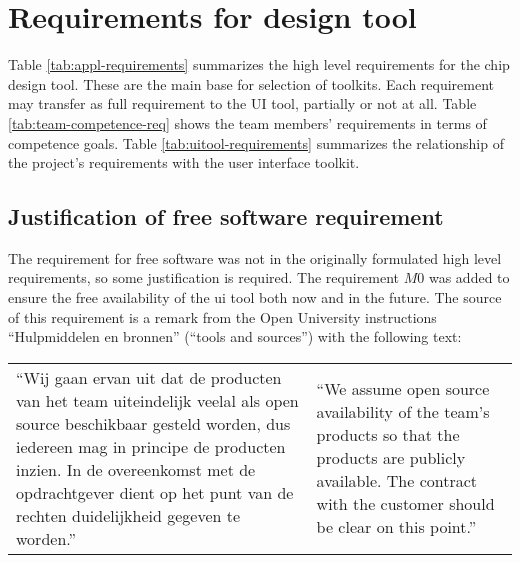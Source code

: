\section{Requirements for design tool}

Table \ref{tab:appl-requirements} summarizes the high level requirements for
the chip design tool. These are the main base for selection of toolkits. Each 
requirement may transfer as full requirement to the UI tool, partially or 
not at all. 
Table \ref{tab:team-competence-req} shows the team members' requirements in 
terms of competence goals. 
Table \ref{tab:uitool-requirements} summarizes the relationship 
of the project's requirements with the user interface toolkit.

\subsection{Justification of free software requirement}

The requirement for free software was not in the originally formulated
high level requirements, so some justification is required. The requirement $M0$ 
was added to ensure the free availability of the ui tool both now and 
in the future. The source of this requirement is a remark from the 
Open University instructions ``Hulpmiddelen en bronnen'' (``tools 
and sources'') with the following text:

\vspace{1em}

\begin{tabular}[t]{ll}
\begin{minipage}{.45\textwidth}

	``Wij gaan ervan uit dat de producten van het team uiteindelijk veelal als
	open source beschikbaar gesteld worden, dus iedereen mag in principe de
	producten inzien. In de overeenkomst met de opdrachtgever dient op het punt
	van de rechten duidelijkheid gegeven te worden.''

\end{minipage}

&

\begin{minipage}{.45\textwidth}

	``We assume open source availability of the team's products so that the
	products are publicly available. The contract with the customer should be
	clear on this point.''

\end{minipage}

\end{tabular}

